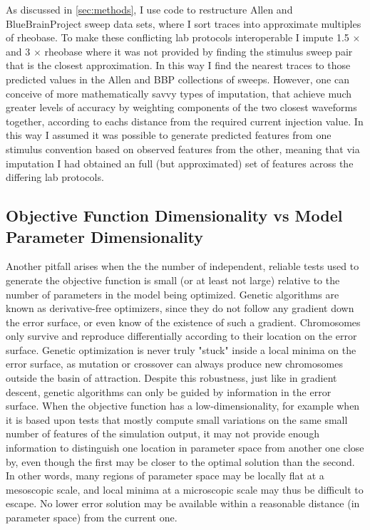 As discussed in \ref{sec:methods}, I use code to restructure Allen and BlueBrainProject sweep data sets, where I sort traces into approximate multiples of rheobase. To make these conflicting lab protocols interoperable I impute 1.5 $\times$ and 3 $\times$ rheobase where it was not provided by finding the stimulus sweep pair that is the closest approximation. In this way I find the nearest traces to those predicted values in the Allen and BBP collections of sweeps. However, one can conceive of more mathematically savvy types of imputation, that achieve much greater levels of accuracy by weighting components of the two closest waveforms together, according to eachs distance from the required current injection value. In this way I assumed it was possible to generate predicted features from one stimulus convention based on observed features from the other, meaning that via imputation I had obtained an full (but approximated) set of features across the differing lab protocols.



\subsection{Objective Function Dimensionality vs Model Parameter Dimensionality}    
Another pitfall arises when the the number of independent, reliable tests used to generate the objective function is small (or at least not large) relative to the number of parameters in the model being optimized.
Genetic algorithms are known as derivative-free optimizers, since they do not follow any gradient down the error surface, or even know of the existence of such a gradient.
Chromosomes only survive and reproduce differentially according to their location on the error surface.
Genetic optimization is never truly "stuck" inside a local minima on the error surface, as mutation or crossover can always produce new chromosomes outside the basin of attraction. Despite this robustness, just like in gradient descent, genetic algorithms can only be guided by information in the error surface.
When the objective function has a low-dimensionality, for example when it is based upon tests that mostly compute small variations on the same small number of features of the simulation output, it may not provide enough information to distinguish one location in parameter space from another one close by, even though the first may be closer to the optimal solution than the second.
In other words, many regions of parameter space may be locally flat at a mesoscopic scale, and local minima at a microscopic scale may thus be difficult to escape.
No lower error solution may be available within a reasonable distance (in parameter space) from the current one.

